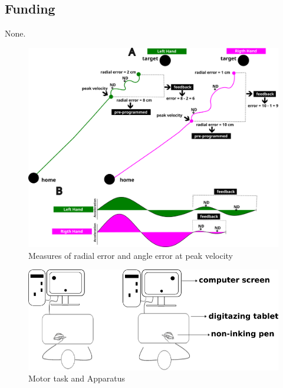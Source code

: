 \documentclass[man,a4paper,12pt,floatsintext]{apa6}
\begin{document}
\subsection{Funding}

None.




\begin{figure}[h] %
\includegraphics[width=\linewidth]{figures/f1.png}
\caption{Measures of radial error and angle error at peak velocity}
\label{fig1}
\end{figure}


\begin{figure}[p] %
\includegraphics[width=\linewidth]{figures/f2.png}
\caption{Motor task and Apparatus}
\label{fig2}
\end{figure}
\end{document}
